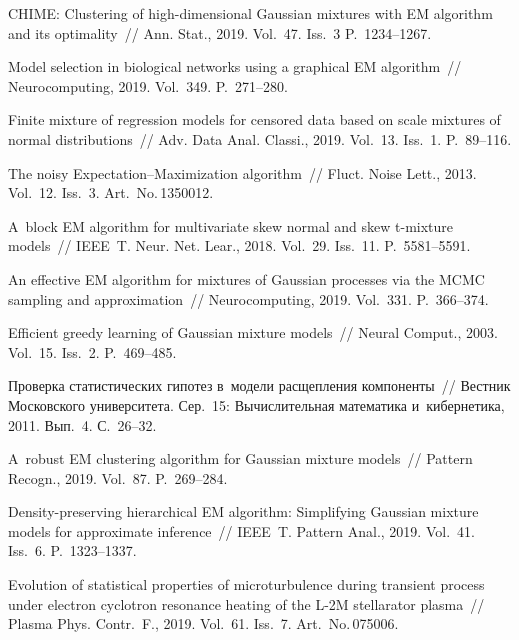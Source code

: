 \begin{multicols}{2}
{{\begin{thebibliography}{99}
  CHIME: Clustering 
of high-dimensional Gaussian mixtures with EM algorithm and its optimality~// 
Ann. Stat., 2019. Vol.~47. Iss.~3 P.~1234--1267.

  
Model selection in biological networks using a graphical EM algorithm~// 
Neurocomputing, 2019. Vol.~349. P.~271--280.

  
Finite mixture of regression models for censored data based on scale mixtures of 
normal distributions~// Adv. Data Anal. Classi., 2019. Vol.~13. Iss.~1. P.~89--116.

  
The noisy Expectation--Maximization algorithm~// Fluct. Noise Lett., 2013. 
Vol.~12. Iss.~3. Art.~No.\,1350012.

  
A~block EM algorithm for multivariate skew normal and skew t-mixture
models~// IEEE~T. Neur. Net. Lear., 2018. 
Vol.~29. Iss.~11. P.~5581--5591.

  
An effective EM algorithm for mixtures of Gaussian processes via the MCMC 
sampling and approximation~// Neurocomputing, 2019. Vol.~331. P.~366--374.

  
Efficient greedy learning of Gaussian mixture models~// 
Neural Comput., 2003. Vol.~15. Iss.~2. P.~469--485.

  
Проверка статистических гипотез в~модели расщепления компоненты~// 
Вестник Мос\-ков\-ско\-го университета. Сер.~15: Вычислительная математика и~кибернетика, 
2011. Вып.~4. С.~26--32.

   
A~robust EM clustering algorithm for Gaussian mixture models~// 
Pattern Recogn., 2019. Vol.~87. P.~269--284.

   
Density-preserving hierarchical EM algorithm: Simplifying Gaussian mixture
models for approximate inference~// IEEE~T. Pattern Anal., 
2019. Vol.~41. Iss.~6. P.~1323--1337.

   
Evolution of statistical properties of microturbulence 
during transient process under electron cyclotron resonance heating of the 
L-2M stellarator plasma~// Plasma Phys. Contr.~F., 2019. Vol.~61. Iss.~7. 
Art.~No.\,075006.


\end{thebibliography}}}
\end{multicols}

